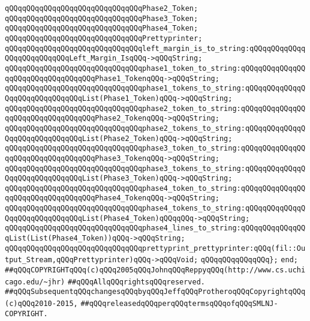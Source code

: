 \verb|qQQqqQQqqQQqqQQqqQQqqQQqqQQqqQQqPhase2_Token;|\newline
\verb|qQQqqQQqqQQqqQQqqQQqqQQqqQQqqQQqPhase3_Token;|\newline
\verb|qQQqqQQqqQQqqQQqqQQqqQQqqQQqqQQqPhase4_Token;|\newline
\verb|qQQqqQQqqQQqqQQqqQQqqQQqqQQqqQQqPrettyprinter;|\newline
\newline
\verb|qQQqqQQqqQQqqQQqqQQqqQQqqQQqqQQqleft_margin_is_to_string:qQQqqQQqqQQqqQQqqQQqqQQqqQQqLeft_Margin_IsqQQq->qQQqString;|\newline
\newline
\verb|qQQqqQQqqQQqqQQqqQQqqQQqqQQqqQQqphase1_token_to_string:qQQqqQQqqQQqqQQqqQQqqQQqqQQqqQQqqQQqPhase1_TokenqQQq->qQQqString;|\newline
\verb|qQQqqQQqqQQqqQQqqQQqqQQqqQQqqQQqphase1_tokens_to_string:qQQqqQQqqQQqqQQqqQQqqQQqqQQqqQQqList(Phase1_Token)qQQq->qQQqString;|\newline
\newline
\verb|qQQqqQQqqQQqqQQqqQQqqQQqqQQqqQQqphase2_token_to_string:qQQqqQQqqQQqqQQqqQQqqQQqqQQqqQQqqQQqPhase2_TokenqQQq->qQQqString;|\newline
\verb|qQQqqQQqqQQqqQQqqQQqqQQqqQQqqQQqphase2_tokens_to_string:qQQqqQQqqQQqqQQqqQQqqQQqqQQqqQQqList(Phase2_Token)qQQq->qQQqString;|\newline
\newline
\verb|qQQqqQQqqQQqqQQqqQQqqQQqqQQqqQQqphase3_token_to_string:qQQqqQQqqQQqqQQqqQQqqQQqqQQqqQQqqQQqPhase3_TokenqQQq->qQQqString;|\newline
\verb|qQQqqQQqqQQqqQQqqQQqqQQqqQQqqQQqphase3_tokens_to_string:qQQqqQQqqQQqqQQqqQQqqQQqqQQqqQQqList(Phase3_Token)qQQq->qQQqString;|\newline
\newline
\verb|qQQqqQQqqQQqqQQqqQQqqQQqqQQqqQQqphase4_token_to_string:qQQqqQQqqQQqqQQqqQQqqQQqqQQqqQQqqQQqPhase4_TokenqQQq->qQQqString;|\newline
\verb|qQQqqQQqqQQqqQQqqQQqqQQqqQQqqQQqphase4_tokens_to_string:qQQqqQQqqQQqqQQqqQQqqQQqqQQqqQQqList(Phase4_Token)qQQqqQQq->qQQqString;|\newline
\verb|qQQqqQQqqQQqqQQqqQQqqQQqqQQqqQQqphase4_lines_to_string:qQQqqQQqqQQqqQQqList(List(Phase4_Token))qQQq->qQQqString;|\newline
\newline
\verb|qQQqqQQqqQQqqQQqqQQqqQQqqQQqqQQqprettyprint_prettyprinter:qQQq(fil::Output_Stream,qQQqPrettyprinter)qQQq->qQQqVoid;|\newline
\verb|qQQqqQQqqQQqqQQq};|\newline
\verb|end;|\newline
\newline
\verb|##qQQqCOPYRIGHTqQQq(c)qQQq2005qQQqJohnqQQqReppyqQQq(http://www.cs.uchicago.edu/~jhr)|\newline
\verb|##qQQqAllqQQqrightsqQQqreserved.|\newline
\verb|##qQQqSubsequentqQQqchangesqQQqbyqQQqJeffqQQqProtheroqQQqCopyrightqQQq(c)qQQq2010-2015,|\newline
\verb|##qQQqreleasedqQQqperqQQqtermsqQQqofqQQqSMLNJ-COPYRIGHT.|\newline

